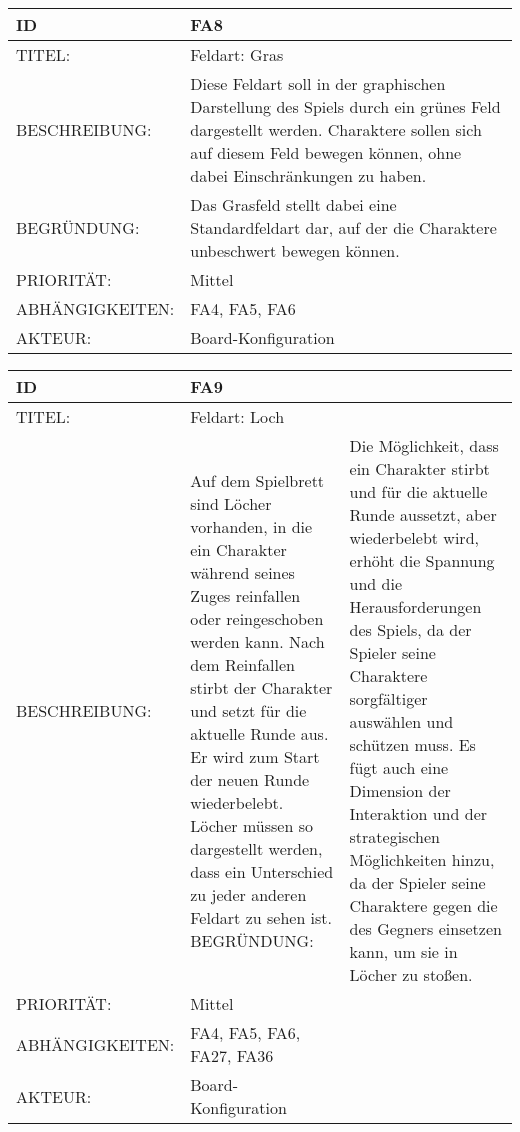 \documentclass{uulm-assignment}
\begin{document}
    \begin{tabularx}{\textwidth}{|l|X |} \hline
        \textbf{ID} & \textbf{FA8} \\
        \hline
        TITEL: &  Feldart: Gras\\
        \hline
        BESCHREIBUNG: & Diese Feldart soll in der graphischen Darstellung des Spiels durch ein grünes Feld dargestellt werden. Charaktere sollen sich auf diesem Feld bewegen können, ohne dabei Einschränkungen zu haben.
        \\
        \hline
        BEGRÜNDUNG: &  Das Grasfeld stellt dabei eine Standardfeldart dar, auf der die Charaktere unbeschwert bewegen können.\\
        \hline
        PRIORITÄT: & Mittel\\
        \hline
        ABHÄNGIGKEITEN: & FA4, FA5, FA6\\
        \hline
        AKTEUR: &  Board-Konfiguration\\
        \hline
    \end{tabularx}
    
    \begin{tabularx}{\textwidth}{|l|X |} \hline
        \textbf{ID} & \textbf{FA9} \\
        \hline
        TITEL: &  Feldart: Loch\\
        \hline
        BESCHREIBUNG: & Auf dem Spielbrett sind Löcher vorhanden, in die ein Charakter während seines Zuges reinfallen oder reingeschoben werden kann. Nach dem Reinfallen stirbt der Charakter und setzt für die aktuelle Runde aus. Er wird zum Start der neuen Runde wiederbelebt. Löcher müssen so dargestellt werden, dass ein Unterschied zu jeder anderen Feldart zu sehen ist.
        \hline
        BEGRÜNDUNG: & Die Möglichkeit, dass ein Charakter stirbt und für die aktuelle Runde aussetzt, aber wiederbelebt wird, erhöht die Spannung und die Herausforderungen des Spiels, da der Spieler seine Charaktere sorgfältiger auswählen und schützen muss. Es fügt auch eine Dimension der Interaktion und der strategischen Möglichkeiten hinzu, da der Spieler seine Charaktere gegen die des Gegners einsetzen kann, um sie in Löcher zu stoßen.\\
        \hline
        PRIORITÄT: & Mittel\\
        \hline
        ABHÄNGIGKEITEN: & FA4, FA5, FA6, FA27, FA36\\
        \hline
        AKTEUR: & Board-Konfiguration\\
        \hline
    \end{tabularx}
    
\end{document}
